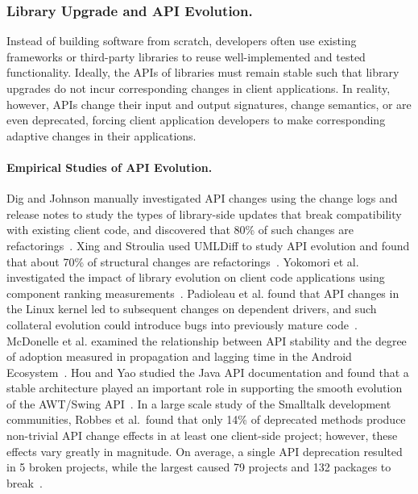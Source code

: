 \subsubsection{Library Upgrade and API Evolution.}
Instead of building software from scratch, developers often use existing frameworks or third-party libraries to reuse well-implemented and tested functionality. Ideally, the APIs of libraries must remain stable such that library upgrades do not incur corresponding changes in client applications. In reality, however, APIs change their input and output signatures, change semantics, or are even deprecated, forcing client application developers to make corresponding adaptive changes in their applications.  

\paragraph{{Empirical Studies of API Evolution.}}
Dig and Johnson manually investigated API changes using the change logs and release notes to study the types of library-side updates that break compatibility with existing client code, and discovered that 80\% of such changes are refactorings~\cite{Dig2005}. Xing and Stroulia used UMLDiff to study API evolution and found that about 70\% of structural changes are refactorings~\cite{Xing2006:apievol}. Yokomori et al. investigated the impact of library evolution on client code applications using component ranking measurements~\cite{Yokomori2009:apiimpact}. Padioleau et al. found that API changes in the Linux kernel led to subsequent changes on dependent drivers, and such collateral evolution could introduce bugs into previously mature code~\cite{Padioleau2006:collateral}. McDonelle et al. examined the relationship between API stability and the degree of adoption measured in propagation and lagging time in the Android Ecosystem~\cite{McDonnell2013:api}. Hou and Yao studied the Java API documentation and found that a stable architecture played an important role in supporting the smooth evolution of the AWT/Swing API~\cite{Hou2011:api}. In a large scale study of the Smalltalk development communities, Robbes et al.~found that only 14\% of deprecated methods produce non-trivial API change effects in at least one client-side project; however, these effects vary greatly in magnitude. On average, a single API deprecation resulted in 5 broken projects, while the largest caused 79 projects and 132 packages to break~\cite{robbes2012}.

